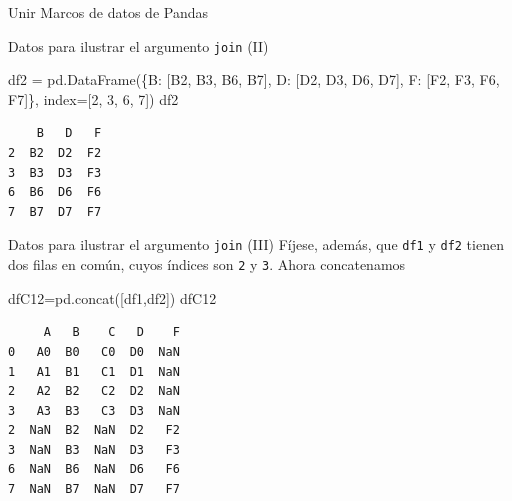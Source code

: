 \documentclass[
  ignorenonframetext,
  aspectratio=169,
  spanish,
]{beamer}
\newenvironment{Shaded}{\begin{snugshade}}{\end{snugshade}}
\newcommand{\DecValTok}[1]{\textcolor[rgb]{0.68,0.00,0.00}{#1}}
\newcommand{\NormalTok}[1]{\textcolor[rgb]{0.00,0.23,0.31}{#1}}
\newcommand{\OperatorTok}[1]{\textcolor[rgb]{0.37,0.37,0.37}{#1}}
\newcommand{\StringTok}[1]{\textcolor[rgb]{0.13,0.47,0.30}{#1}}
\begin{document}
\begin{frame}[fragile]{Unir Marcos de datos de Pandas}
\begin{block}{Datos para ilustrar el argumento \texttt{join} (II)}
\begin{Shaded}
\begin{Highlighting}[]
\NormalTok{df2 }\OperatorTok{=}\NormalTok{ pd.DataFrame(\{}\StringTok{\textquotesingle{}B\textquotesingle{}}\NormalTok{: [}\StringTok{\textquotesingle{}B2\textquotesingle{}}\NormalTok{, }\StringTok{\textquotesingle{}B3\textquotesingle{}}\NormalTok{, }\StringTok{\textquotesingle{}B6\textquotesingle{}}\NormalTok{, }\StringTok{\textquotesingle{}B7\textquotesingle{}}\NormalTok{],}
                    \StringTok{\textquotesingle{}D\textquotesingle{}}\NormalTok{: [}\StringTok{\textquotesingle{}D2\textquotesingle{}}\NormalTok{, }\StringTok{\textquotesingle{}D3\textquotesingle{}}\NormalTok{, }\StringTok{\textquotesingle{}D6\textquotesingle{}}\NormalTok{, }\StringTok{\textquotesingle{}D7\textquotesingle{}}\NormalTok{],}
                    \StringTok{\textquotesingle{}F\textquotesingle{}}\NormalTok{: [}\StringTok{\textquotesingle{}F2\textquotesingle{}}\NormalTok{, }\StringTok{\textquotesingle{}F3\textquotesingle{}}\NormalTok{, }\StringTok{\textquotesingle{}F6\textquotesingle{}}\NormalTok{, }\StringTok{\textquotesingle{}F7\textquotesingle{}}\NormalTok{]\},}
\NormalTok{                         index}\OperatorTok{=}\NormalTok{[}\DecValTok{2}\NormalTok{, }\DecValTok{3}\NormalTok{, }\DecValTok{6}\NormalTok{, }\DecValTok{7}\NormalTok{])}
\NormalTok{df2}
\end{Highlighting}
\end{Shaded}

\begin{verbatim}
    B   D   F
2  B2  D2  F2
3  B3  D3  F3
6  B6  D6  F6
7  B7  D7  F7
\end{verbatim}
\end{block}

\begin{block}{Datos para ilustrar el argumento \texttt{join} (III)}
\label{datos-para-ilustrar-el-argumento-join-iii}
Fíjese, además, que \texttt{df1} y \texttt{df2} tienen dos filas en
común, cuyos índices son \texttt{2} y \texttt{3}. Ahora concatenamos

\begin{Shaded}
\begin{Highlighting}[]
\NormalTok{dfC12}\OperatorTok{=}\NormalTok{pd.concat([df1,df2])   }
\NormalTok{dfC12}
\end{Highlighting}
\end{Shaded}

\begin{verbatim}
     A   B    C   D    F
0   A0  B0   C0  D0  NaN
1   A1  B1   C1  D1  NaN
2   A2  B2   C2  D2  NaN
3   A3  B3   C3  D3  NaN
2  NaN  B2  NaN  D2   F2
3  NaN  B3  NaN  D3   F3
6  NaN  B6  NaN  D6   F6
7  NaN  B7  NaN  D7   F7
\end{verbatim}


\end{block}
\end{frame}
\end{document}
